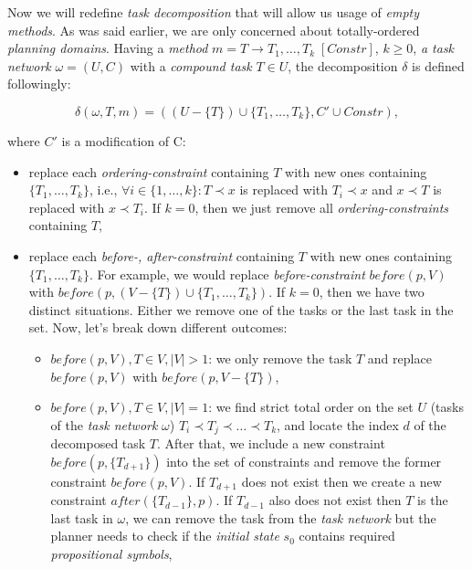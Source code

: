 \medskip\noindent
Now we will redefine \emph{task decomposition} that will allow us usage of \emph{empty methods}. As was said earlier, we are only concerned about totally-ordered \emph{planning domains}. Having a \emph{method} $m = T \rightarrow T_1, \dots, T_k \; [Constr]$, $k \geq 0$, \emph{a task network} $\omega = (U, C)$ with a \emph{compound task} $T \in U$, the decomposition $\delta$ is defined followingly:

\[
    \delta(\omega, T, m) = ((U - \{ T \}) \cup \{T_1, \dots, T_k\}, C' \cup Constr),
\]

\noindent
where $C'$ is a modification of C:

\begin{itemize}
    \item replace each \emph{ordering-constraint} containing $T$ with new ones containing $\{ T_1, \dots, T_k \}$, i.e., $\forall i \in \{ 1, \dots, k \}: T \prec x$ is replaced with $T_i \prec x$ and $x \prec T$ is replaced with $x \prec T_i$. If $k = 0$, then we just remove all \emph{ordering-constraints} containing $T$,
        
    \item replace each \emph{before-, after-constraint} containing $T$ with new ones containing $\{ T_1, \dots, T_k \}$. For example, we would replace \emph{before-constraint} $before(p,V)$ with $before(p, (V - \{T\}) \cup \{ T_1, \dots, T_k \})$. If $k = 0$, then we have two distinct situations. Either we remove one of the tasks or the last task in the set. Now, let's break down different outcomes:

        \begin{itemize}
            \item $before(p, V), T \in V, |V| > 1$: we only remove the task $T$ and replace $before(p, V)$ with $before(p, V - \{ T \})$,

            \item $before(p, V), T \in V, |V| = 1$: we find strict total order on the set $U$ (tasks of the \emph{task network} $\omega$) $T_i \prec T_j \prec \dots \prec T_k$, and locate the index $d$ of the decomposed task $T$. After that, we include a new constraint $before(p, \{ T_{d+1} \})$ into the set of constraints and remove the former constraint $before(p, V)$. If $T_{d+1}$ does not exist then we create a new constraint $after(\{ T_{d-1} \}, p)$. If $T_{d-1}$ also does not exist then $T$ is the last task in $\omega$, we can remove the task from the \emph{task network} but the planner needs to check if the \emph{initial state} $s_0$ contains required \emph{propositional symbols},


\end{itemize}
\end{itemize}
